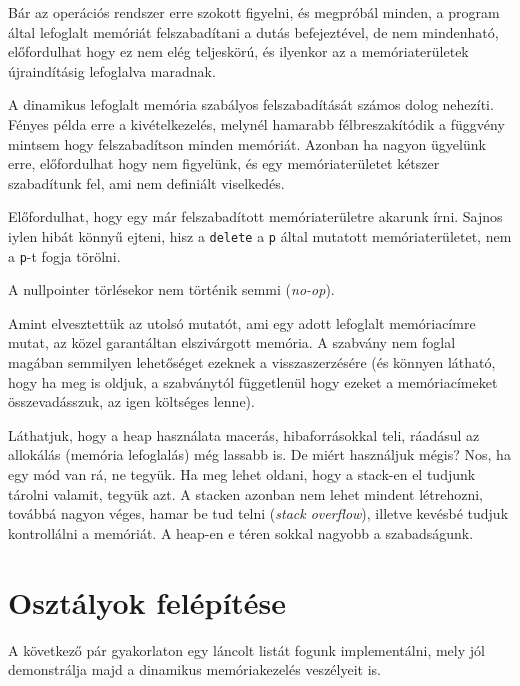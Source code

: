 \documentclass[a4paper,11.5pt,table]{article}
\begin{document}
	Bár az operációs rendszer erre szokott figyelni, és megpróbál minden, a program által lefoglalt memóriát felszabadítani a dutás befejeztével, de nem mindenható, előfordulhat hogy ez nem elég teljeskörú, és ilyenkor az a memóriaterületek újraindításig lefoglalva maradnak.
	\medskip
	
	A dinamikus lefoglalt memória szabályos felszabadítását számos dolog nehezíti. Fényes példa erre a kivételkezelés, melynél hamarabb félbreszakítódik a függvény mintsem hogy felszabadítson minden memóriát. Azonban ha nagyon ügyelünk erre, előfordulhat hogy nem figyelünk, és egy memóriaterületet kétszer szabadítunk fel, ami nem definiált viselkedés.
	\medskip
	
	Előfordulhat, hogy egy már felszabadított memóriaterületre akarunk írni. Sajnos iylen hibát könnyű ejteni, hisz a \texttt{delete} a \texttt{p} által mutatott memóriaterületet, nem a \texttt{p}-t fogja törölni.
	\begin{note}
		A nullpointer törlésekor nem történik semmi (\textit{no-op}).
	\end{note}
	\begin{note}
		Amint elvesztettük az utolsó mutatót, ami egy adott lefoglalt memóriacímre mutat, az közel garantáltan elszivárgott memória. A szabvány nem foglal magában semmilyen lehetőséget ezeknek a visszaszerzésére (és könnyen látható, hogy ha meg is oldjuk, a szabványtól függetlenül hogy ezeket a memóriacímeket összevadásszuk, az igen költséges lenne).
	\end{note}
	Láthatjuk, hogy a heap használata macerás, hibaforrásokkal teli, ráadásul az allokálás (memória lefoglalás) még lassabb is. De miért használjuk mégis? Nos, ha egy mód van rá, ne tegyük. Ha meg lehet oldani, hogy a stack-en el tudjunk tárolni valamit, tegyük azt. A stacken azonban nem lehet mindent létrehozni, továbbá nagyon véges, hamar be tud telni (\textit{stack overflow}), illetve kevésbé tudjuk kontrollálni a memóriát. A heap-en e téren sokkal nagyobb a szabadságunk.
	\section{Osztályok felépítése}
	A következő pár gyakorlaton egy láncolt listát fogunk implementálni, mely jól demonstrálja majd a dinamikus memóriakezelés veszélyeit is.
	
\end{document}
